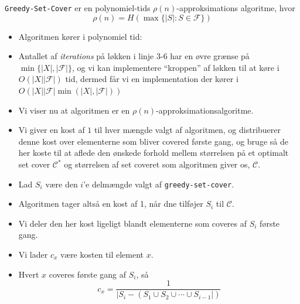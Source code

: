 \begin{frame}[allowframebreaks]
\begin{itemize}
  \end{itemize}
  \begin{theorem}
	\texttt{Greedy-Set-Cover} er en polynomiel-tids \(\rho(n)\)-approksimations algoritme, hvor
	\begin{equation*}
\rho(n) = H(\max \{|S| : S \in \mathcal{F}\})
	\end{equation*}
  \end{theorem}
  \begin{itemize}
	\item Algoritmen kører i polynomiel tid:
	\item Antallet af \textit{iterations} på løkken i linje 3-6 har en øvre grænse på $\min\{|X|, |\mathcal{F}|\}$, og vi kan implementere ``kroppen'' af løkken til at køre i $O(|X||\mathcal{F}|)$ tid, dermed får vi en implementation der kører i $O(|X||\mathcal{F}| \min(|X|, |\mathcal{F}|))$
	\item Vi viser nu at algoritmen er en \(\rho(n)\)-approksimationsalgoritme.
	\item Vi giver en kost af $1$ til hver mængde valgt af algoritmen, og distribuerer denne kost over elementerne som bliver covered første gang, og bruge så de her koste til at aflede den ønskede forhold mellem størrelsen på et optimalt set cover $\mathcal{C}^{*}$ og størrelsen af set coveret som algoritmen giver os, $\mathcal{C}$.
	\item Lad $S_{i}$ være den $i$'e delmængde valgt af \texttt{greedy-set-cover}.
	\item Algoritmen tager altså en kost af 1, når dne tilføjer $S_{i}$ til $\mathcal{C}$.
	\item Vi deler den her kost ligeligt blandt elementerne som coveres af $S_{i}$ første gang.
	\item Vi lader $c_{x}$ være kosten til element $x$.
	\item Hvert $x$ coveres første gang af $S_{i}$, så
		  \begin{equation*}
			c_{x} = \frac{1}{|S_{i} - (S_1 \cup S_{2} \cup \cdots \cup S_{i-1}|)}
		  \end{equation*}


\end{itemize}
\end{frame}
